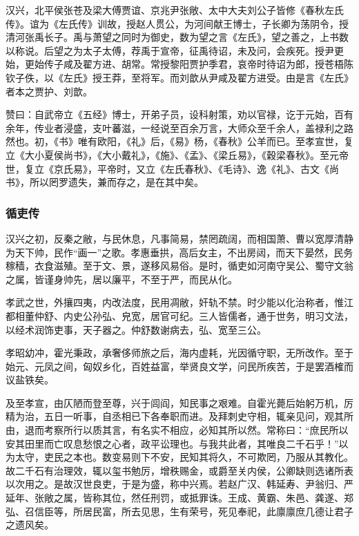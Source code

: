 \documentclass[]{article}
\begin{document}
汉兴，北平侯张苍及梁大傅贾谊、京兆尹张敞、太中大夫刘公子皆修《春秋左氏传》。谊为《左氏传》训故，授赵人贯公，为河间献王博士，子长卿为荡阴令，授清河张禹长子。禹与萧望之同时为御史，数为望之言《左氏》，望之善之，上书数以称说。后望之为太子太傅，荐禹于宣帝，征禹待诏，未及问，会疾死。授尹更始，更始传子咸及翟方进、胡常。常授黎阳贾护季君，哀帝时待诏为郎，授苍梧陈钦子佚，以《左氏》授王莽，至将军。而刘歆从尹咸及翟方进受。由是言《左氏》者本之贾护、刘歆。

赞曰：自武帝立《五经》博士，开弟子员，设科射策，劝以官禄，讫于元始，百有余年，传业者浸盛，支叶蕃滋，一经说至百余万言，大师众至千余人，盖禄利之路然也。初，《书》唯有欧阳，《礼》后，《易》杨，《春秋》公羊而已。至孝宣世，复立《大小夏侯尚书》，《大小戴礼》，《施》、《孟》、《梁丘易》，《穀梁春秋》。至元帝世，复立《京氏易》，平帝时，又立《左氏春秋》、《毛诗》、逸《礼》、古文《尚书》，所以罔罗遗失，兼而存之，是在其中矣。

\hypertarget{header-n5979}{%
\subsubsection{循吏传}\label{header-n5979}}

汉兴之初，反秦之敝，与民休息，凡事简易，禁罔疏阔，而相国萧、曹以宽厚清静为天下帅，民作``画一''之歌。孝惠垂拱，高后女主，不出房闼，而天下晏然，民务稼穑，衣食滋殖。至于文、景，遂移风易俗。是时，循吏如河南守吴公、蜀守文翁之属，皆谨身帅先，居以廉平，不至于严，而民从化。

孝武之世，外攘四夷，内改法度，民用凋敝，奸轨不禁。时少能以化治称者，惟江都相董仲舒、内史公孙弘、皃宽，居官可纪。三人皆儒者，通于世务，明习文法，以经术润饰吏事，天子器之。仲舒数谢病去，弘、宽至三公。

孝昭幼冲，霍光秉政，承奢侈师旅之后，海内虚耗，光因循守职，无所改作。至于始元、元凤之间，匈奴乡化，百姓益富，举贤良文学，问民所疾苦，于是罢酒榷而议盐铁矣。

及至孝宣，由仄陋而登至尊，兴于闾阎，知民事之艰难。自霍光薨后始躬万机，厉精为治，五日一听事，自丞相已下各奉职而进。及拜刺史守相，辄亲见问，观其所由，退而考察所行以质其言，有名实不相应，必知其所以然。常称曰：``庶民所以安其田里而亡叹息愁恨之心者，政平讼理也。与我共此者，其唯良二千石乎！''以为太守，吏民之本也。数变易则下不安，民知其将久，不可欺罔，乃服从其教化。故二千石有治理效，辄以玺书勉厉，增秩赐金，或爵至关内侯，公卿缺则选诸所表以次用之。是故汉世良吏，于是为盛，称中兴焉。若赵广汉、韩延寿、尹翁归、严延年、张敞之属，皆称其位，然任刑罚，或抵罪诛。王成、黄霸、朱邑、龚遂、郑弘、召信臣等，所居民富，所去见思，生有荣号，死见奉祀，此廪廪庶几德让君子之遗风矣。
\end{document}
